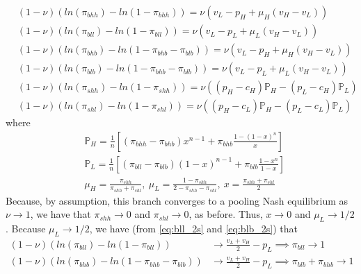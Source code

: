 \documentclass[12pt]{article}
\begin{document}
\begin{align}
&(1 - \nu) \left( ln \left( \pi_{bhh} \right) - ln \left( 1 - \pi_{bhh} \right) \right) = \nu \left( v_L - p_H + \mu_H (v_H - v_L) \right) \label{eq:bhh_2s} \\
&(1 - \nu) \left( ln \left( \pi_{bll} \right) - ln \left( 1 - \pi_{bll} \right) \right) = \nu \left( v_L - p_L + \mu_L (v_H - v_L) \right) \label{eq:bll_2s} \\
&(1 - \nu) \left( ln \left( \pi_{bhb} \right) - ln \left( 1 - \pi_{bhb} - \pi_{blb} \right) \right) = \nu \left( v_L - p_H + \mu_H (v_H - v_L) \right) \label{eq:bhb_2s} \\
&(1 - \nu) \left( ln \left( \pi_{blb} \right) - ln \left( 1 - \pi_{bhb} - \pi_{blb} \right) \right) = \nu \left( v_L - p_L + \mu_L (v_H - v_L) \right) \label{eq:blb_2s} \\
&(1 - \nu) \left( ln \left( \pi_{shh} \right) - ln \left( 1 - \pi_{shh} \right) \right) = \nu \left( (p_H - c_H) \mathbb{P}_H - (p_L - c_H) \mathbb{P}_L \right) \label{eq:shh_2s} \\
&(1 - \nu) \left( ln \left( \pi_{shl} \right) - ln \left( 1 - \pi_{shl} \right) \right) = \nu \left( (p_H - c_L) \mathbb{P}_H - (p_L - c_L) \mathbb{P}_L \right) \label{eq:shl_2s}
\end{align}
where
\begin{align*}
&\mathbb{P}_H = \frac{1}{n} \left[ (\pi_{bhh} - \pi_{bhb}) x^{n-1} + \pi_{bhb} \frac{1 - (1 - x)^n}{x} \right] \\
&\mathbb{P}_L = \frac{1}{n} \left[ (\pi_{bll} - \pi_{blb}) (1 - x)^{n-1} + \pi_{blb} \frac{1 - x^n}{1 - x} \right] \\
&\mu_H = \frac{\pi_{shh}}{\pi_{shh} + \pi_{shl}} , \ \mu_L = \frac{1 - \pi_{shh}}{2 - \pi_{shh} - \pi_{shl}} , \ x = \frac{\pi_{shh} + \pi_{shl}}{2}
\end{align*}
Because, by assumption, this branch converges to a pooling Nash equilibrium as $\nu \to 1$, we have that $\pi_{shh} \to 0$ and $\pi_{shl} \to 0$, as before. Thus, $x \to 0$ and $\mu_L \to 1/2$. Because $\mu_L \to 1/2$, we have (from \ref{eq:bll_2s} and \ref{eq:blb_2s}) that
\begin{align*}
(1 - \nu) \left( ln \left( \pi_{bll} \right) - ln \left( 1 - \pi_{bll} \right) \right) &\to \frac{v_L + v_H}{2} - p_L \implies \pi_{bll} \to 1 \\
(1 - \nu) \left( ln \left( \pi_{bhb} \right) - ln \left( 1 - \pi_{bhb} - \pi_{blb} \right) \right) &\to \frac{v_L + v_H}{2} - p_L \implies \pi_{blb} + \pi_{bhb} \to 1 
\end{align*}
\end{document}
